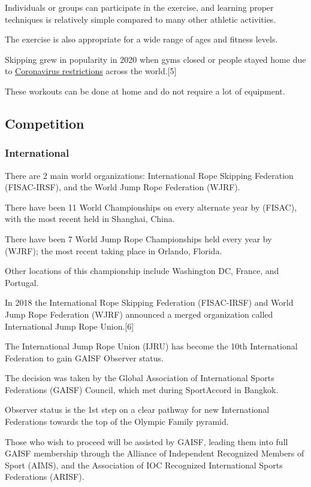 \documentclass[oneside]{book}
\numberwithin{equation}{section}
\begin{document}
Individuals or groups can participate in the exercise, and learning proper techniques is relatively simple compared to many other athletic activities.

The exercise is also appropriate for a wide range of ages and fitness levels.

%
Skipping grew in popularity in 2020 when gyms closed or people stayed home due to \href{https://en.wikipedia.org/wiki/COVID-19_lockdowns}{Coronavirus restrictions} across the world.[5]

These workouts can be done at home and do not require a lot of equipment.

\subsection{Competition}

\subsubsection{International}
There are 2 main world organizations: International Rope Skipping Federation (FISAC-IRSF), and the World Jump Rope Federation (WJRF).

There have been 11 World Championships on every alternate year by (FISAC), with the most recent held in Shanghai, China.

There have been 7 World Jump Rope Championships held every year by (WJRF); the most recent taking place in Orlando, Florida.

Other locations of this championship include Washington DC, France, and Portugal.

%
In 2018 the International Rope Skipping Federation (FISAC-IRSF) and World Jump Rope Federation (WJRF) announced a merged organization called International Jump Rope Union.[6]

The International Jump Rope Union (IJRU) has become the 10th International Federation to gain GAISF Observer status.

The decision was taken by the Global Association of International Sports Federations (GAISF) Council, which met during SportAccord in Bangkok.

Observer status is the 1st step on a clear pathway for new International Federations towards the top of the Olympic Family pyramid.

Those who wish to proceed will be assisted by GAISF, leading them into full GAISF membership through the Alliance of Independent Recognized Members of Sport (AIMS), and the Association of IOC Recognized International Sports Federations (ARISF).
\end{document}

